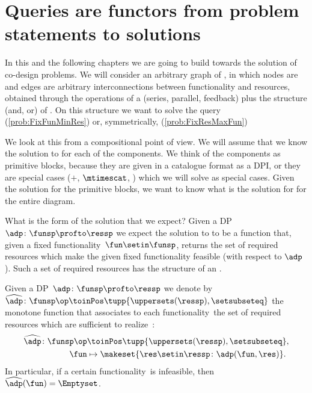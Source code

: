 
\section{Queries are functors from problem statements to solutions}

In this and the following chapters we are going to build towards the solution of co-design problems.
We will consider an arbitrary graph of , in which nodes are  and edges are arbitrary interconnections between functionality and resources, obtained through the operations of a  (series, parallel, feedback) plus the  structure (and, or) of .
On this structure we want to solve the query \FixFunMinRes (\cref{prob:FixFunMinRes}) or, symmetrically, \FixResMaxFun (\cref{prob:FixResMaxFun})

We look at this from a compositional point of view.
We will assume that we know the solution to \FixFunMinRes for each of the components.
We think of the components as primitive blocks, because they are given in a catalogue format as a DPI, or they are special cases ($+$, $\mtimescat$, \etc) which we will solve as special cases.
Given the solution for the primitive blocks, we want to know what is the solution for \FixFunMinRes for the entire diagram.

What is the form of the solution that we expect?
Given a DP~$\adp\colon \funsp \profto \ressp$ we expect the solution to \FixFunMinRes to be a function that, given a fixed functionality~$\fun\setin\funsp$, returns the set of required resources which make the given fixed functionality feasible (with respect to $\adp$). Such a set of required resources has the structure of an .

\begin{definition}
    \label{def:ftoR-dp}
    Given a DP~$\adp\colon\funsp\profto\ressp$ we denote by~$\widehat{\adp} \colon \funsp\op\toinPos \tupp{\uppersets (\ressp), \setsubseteq}$ the monotone function that associates to each functionality~\fun the set of required resources which are sufficient to realize~\fun:
    \begin{equation}
        \begin{aligned}
            \widehat{\adp}\colon \funsp\op & \toinPos \tupp{\uppersets (\ressp), \setsubseteq}, \\
            \fun                      & \mapsto \makeset{ \res \setin \ressp \colon \adp(\fun, \res)}.
        \end{aligned}
    \end{equation}
    In particular, if a certain functionality~\fun is infeasible, then~$\widehat{\adp}(\fun)=\Emptyset$.
\end{definition}


